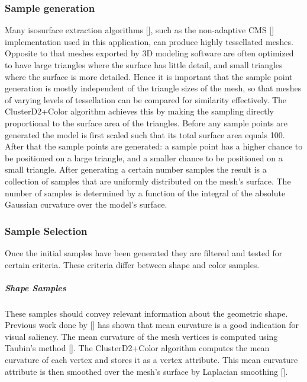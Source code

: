 \subsubsection{Sample generation}

Many isosurface extraction algorithms [], such as the non-adaptive CMS []
implementation used in this application, can produce highly tessellated meshes. Opposite to that meshes exported by
3D modeling software are often optimized to have large triangles where the surface has little detail, and small triangles where
the surface is more detailed. Hence it is important that the sample point generation is mostly independent of the triangle sizes
of the mesh, so that meshes of varying levels of tessellation can be compared for similarity effectively.
The ClusterD2+Color algorithm achieves this by making the sampling directly proportional to the surface area of the triangles.
Before any sample points are generated the model is first scaled such that its total surface area equals 100. After that the sample points are generated: a sample point
has a higher chance to be positioned on a large triangle, and a smaller chance to be positioned on a small triangle.
After generating a certain number samples the result is a collection of samples that are uniformly distributed on the mesh's surface. The number of samples
is determined by a function of the integral of the absolute Gaussian curvature over the model's surface.

\subsubsection{Sample Selection}

Once the initial samples have been generated they are filtered and tested for certain criteria.
These criteria differ between shape and color samples.

\subparagraph{Shape Samples}
These samples should convey relevant information about the geometric shape. Previous work done by [] has
shown that mean curvature is a good indication for visual saliency. The mean curvature of the mesh vertices is computed using Taubin's method [].
The ClusterD2+Color algorithm computes the mean curvature of each vertex and stores it as a vertex attribute. This mean curvature attribute is then smoothed over the mesh's surface
by Laplacian smoothing [].

